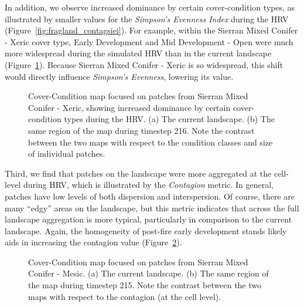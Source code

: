 In addition, we observe increased dominance by certain cover-condition types, as illustrated by smaller values for the \emph{Simpson's Evenness Index} during the HRV (Figure~\ref{fig:fragland_contagsiei}). For example, within the Sierran Mixed Conifer - Xeric cover type, Early Development and Mid Development - Open were much more widespread during the simulated HRV than in the current landscape (Figure~\ref{fig:patchmaps2}). Because Sierran Mixed Conifer - Xeric is so widespread, this shift would directly influence \emph{Simpson's Evenness}, lowering its value.
\begin{figure}[!htbp]
  \centering
  \caption{Cover-Condition map focused on patches from Sierran Mixed Conifer - Xeric, showing increased dominance by certain cover-condition types during the HRV. (a) The current landscape. (b) The same region of the map during timestep 216. Note the contrast between the two maps with respect to the condition classes and size of individual patches.} %
  \label{fig:patchmaps2}
\end{figure}


Third, we find that patches on the landscape were more aggregated at the cell-level during HRV, which is illustrated by the \emph{Contagion} metric. In general, patches have low levels of both dispersion and interspersion. Of course, there are many ``edgy'' areas on the landscape, but this metric indicates that across the full landscape aggregation is more typical, particularly in comparison to the current landscape. Again, the homogeneity of post-fire early development stands likely aids in increasing the contagion value (Figure~\ref{fig:patchmaps3}). 
\begin{figure}[!htbp]
  \centering
  \caption{Cover-Condition map focused on patches from Sierran Mixed Conifer - Mesic. (a) The current landscape. (b) The same region of the map during timestep 215. Note the contrast between the two maps with respect to the contagion (at the cell level).} 
  \label{fig:patchmaps3} %
\end{figure}

